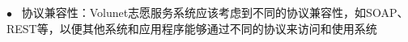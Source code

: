 $\bullet   \enspace$ 协议兼容性：Volunet志愿服务系统应该考虑到不同的协议兼容性，如SOAP、REST等，以便其他系统和应用程序能够通过不同的协议来访问和使用系统
\hfill 



\newpage